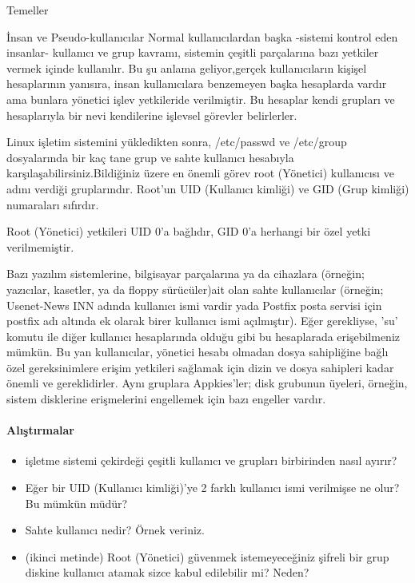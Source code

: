 \begin{section}{Temeller}
\begin{subsection}{İnsan ve Pseudo-kullanıcılar}
Normal kullanıcılardan başka -sistemi kontrol eden insanlar- kullanıcı ve grup kavramı, sistemin çeşitli parçalarına bazı yetkiler vermek içinde kullanılır. Bu şu anlama geliyor,gerçek kullanıcıların kişişel hesaplarının yanısıra, insan kullanıcılara benzemeyen başka hesaplarda vardır ama bunlara yönetici işlev yetkileride verilmiştir. Bu hesaplar kendi grupları ve hesaplarıyla bir nevi
kendilerine işlevsel görevler belirlerler.

Linux işletim sistemini yükledikten sonra, /etc/passwd ve /etc/group dosyalarında bir kaç tane grup ve sahte kullanıcı hesabıyla karşılaşabilirsiniz.Bildiğiniz üzere en önemli görev root (Yönetici) kullanıcısı ve adını verdiği gruplarındır. Root'un UID (Kullanıcı kimliği) ve GID (Grup kimliği) numaraları sıfırdır.

Root (Yönetici) yetkileri UID 0'a bağlıdır, GID 0'a herhangi bir özel yetki verilmemiştir.

Bazı yazılım sistemlerine, bilgisayar parçalarına ya da cihazlara (örneğin; yazıcılar, kasetler, ya da floppy sürücüler)ait olan sahte kullanıcılar (örneğin; Usenet-News INN adında kullanıcı ismi vardir yada Postfix posta servisi için postfix adı altında ek olarak birer kullanıcı ismi açılmıştır). Eğer gerekliyse, 'su' komutu ile diğer kullanıcı hesaplarında olduğu gibi bu hesaplarada erişebilmeniz mümkün. Bu yan kullanıcılar, yönetici hesabı olmadan dosya sahipliğine bağlı özel gereksinimlere erişim yetkileri sağlamak için dizin ve dosya sahipleri kadar önemli ve gereklidirler. Aynı gruplara Appkies'ler; disk grubunun üyeleri, örneğin, sistem disklerine erişmelerini engellemek için bazı engeller vardır.
\end{subsection}
\paragraph{Alıştırmalar}{
\begin{itemize}
\item işletme sistemi çekirdeği çeşitli kullanıcı ve grupları birbirinden nasıl ayırır?
\item Eğer bir UID (Kullanıcı kimliği)'ye 2 farklı kullanıcı ismi verilmişse ne olur? Bu mümkün müdür?
\item Sahte kullanıcı nedir? Örnek veriniz.
\item (ikinci metinde) Root (Yönetici) güvenmek istemeyeceğiniz şifreli bir grup diskine kullanıcı atamak sizce kabul edilebilir mi? Neden?
\end{itemize}}
\end{section}
